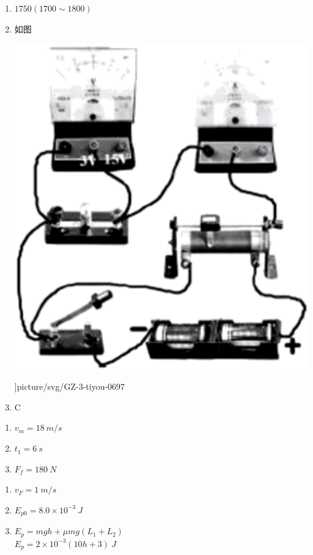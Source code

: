 \item \begin {enumerate} \item $1750(1700 \sim 1800)$ \item 如图 \begin {center} \includegraphics [width=0.7\linewidth ]{picture/screenshot040} \end {center} \begin {center} \linewidth ]{picture/svg/GZ-3-tiyou-0697} \end {center} \item C \end {enumerate}
\item \begin {enumerate} \item $v_{m}=18 \ m/s$ \item $t_{1}=6 \ s $ \item $ F_{f}=180 \ N$ \end {enumerate}
\item \begin {enumerate} \item $v_{F}=1 \ m / s$ \item $E_{p 0}=8.0 \times 10^{-3} \ J$ \item $ E_{p}=m g h+\mu m g\left (L_{1}+L_{2}\right ) $\\ $ E_{p}=2 \times 10^{-3}(10 h+3) \ J $ \end {enumerate}
